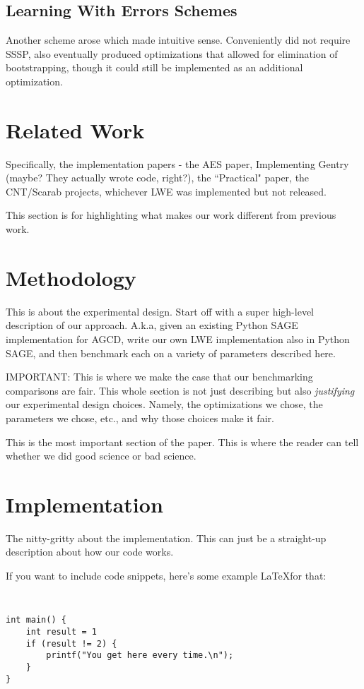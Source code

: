 \documentclass[letterpaper,twocolumn,10pt]{article}
\begin{document}
\subsection{Learning With Errors Schemes}
Another scheme arose which made intuitive sense. Conveniently did not require SSSP, also eventually produced optimizations that allowed for elimination of bootstrapping, though it could still be implemented as an additional optimization.


\section{Related Work}
Specifically, the implementation papers - the AES paper, Implementing Gentry (maybe? They actually wrote code, right?), the ``Practical" paper, the CNT/Scarab projects, whichever LWE was implemented but not released.

This section is for highlighting what makes our work different from previous work.


\section{Methodology}
This is about the experimental design. Start off with a super high-level description of our approach. A.k.a, given an existing Python SAGE implementation for AGCD, write our own LWE implementation also in Python SAGE, and then benchmark each on a variety of parameters described here. 

IMPORTANT: This is where we make the case that our benchmarking comparisons are fair. This whole section is not just describing but also \emph{justifying} our experimental design choices. Namely, the optimizations we chose, the parameters we chose, etc., and why those choices make it fair. 

This is the most important section of the paper. This is where the reader can tell whether we did good science or bad science.


\section{Implementation}
The nitty-gritty about the implementation. This can just be a straight-up description about how our code works.

If you want to include code snippets, here's some example \LaTeX for that:

{\tt \small
\begin{verbatim}
int main() {
    int result = 1
    if (result != 2) {
        printf("You get here every time.\n");
    }
}
\end{verbatim}
}
\end{document}
